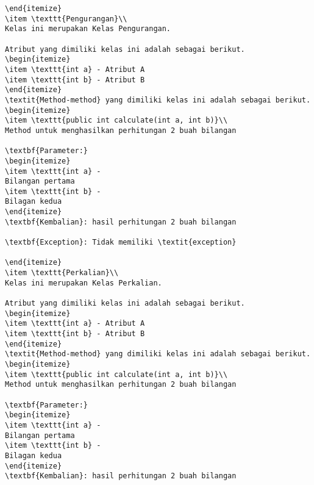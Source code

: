 \begin{lstlisting}[caption=Hasil Pengujian Pertama]
\end{itemize}
\item \texttt{Pengurangan}\\ 
Kelas ini merupakan Kelas Pengurangan.

Atribut yang dimiliki kelas ini adalah sebagai berikut.
\begin{itemize}
\item \texttt{int a} - Atribut A
\item \texttt{int b} - Atribut B
\end{itemize}
\textit{Method-method} yang dimiliki kelas ini adalah sebagai berikut.
\begin{itemize}
\item \texttt{public int calculate(int a, int b)}\\ 
Method untuk menghasilkan perhitungan 2 buah bilangan

\textbf{Parameter:}
\begin{itemize}
\item \texttt{int a} - 
Bilangan pertama
\item \texttt{int b} - 
Bilagan kedua
\end{itemize}
\textbf{Kembalian}: hasil perhitungan 2 buah bilangan

\textbf{Exception}: Tidak memiliki \textit{exception}

\end{itemize}
\item \texttt{Perkalian}\\ 
Kelas ini merupakan Kelas Perkalian.

Atribut yang dimiliki kelas ini adalah sebagai berikut.
\begin{itemize}
\item \texttt{int a} - Atribut A
\item \texttt{int b} - Atribut B
\end{itemize}
\textit{Method-method} yang dimiliki kelas ini adalah sebagai berikut.
\begin{itemize}
\item \texttt{public int calculate(int a, int b)}\\ 
Method untuk menghasilkan perhitungan 2 buah bilangan

\textbf{Parameter:}
\begin{itemize}
\item \texttt{int a} - 
Bilangan pertama
\item \texttt{int b} - 
Bilagan kedua
\end{itemize}
\textbf{Kembalian}: hasil perhitungan 2 buah bilangan


\end{lstlisting}
